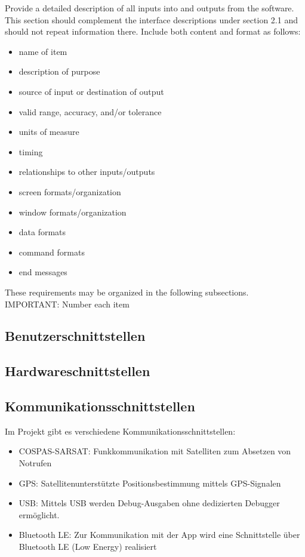 \noindent Provide a detailed description of all inputs into and outputs from the software. This section should complement the interface descriptions under section 2.1 and should not repeat information there. Include both content and format as follows:
\begin{itemize}
	\item name of item
	\item description of purpose
	\item source of input or destination of output
	\item valid range, accuracy, and/or tolerance
	\item units of measure
	\item timing
	\item relationships to other inputs/outputs
	\item screen formats/organization
	\item window formats/organization
	\item data formats
	\item command formats
	\item end messages
\end{itemize}

\noindent These requirements may be organized in the following subsections. \\[0.1cm]
IMPORTANT: Number each item

\subsection{Benutzerschnittstellen}

\subsection{Hardwareschnittstellen}

\subsection{Kommunikationsschnittstellen}

Im Projekt gibt es verschiedene Kommunikationsschnittstellen:
\begin{itemize}
	\item COSPAS-SARSAT: Funkkommunikation mit Satelliten zum Absetzen von Notrufen
	\item GPS: Satellitenunterstützte Positionsbestimmung mittels GPS-Signalen
	\item USB: Mittels USB werden Debug-Ausgaben ohne dedizierten Debugger ermöglicht.
	\item Bluetooth LE: Zur Kommunikation mit der App wird eine Schnittstelle über Bluetooth LE (Low Energy) realisiert	
\end{itemize}

